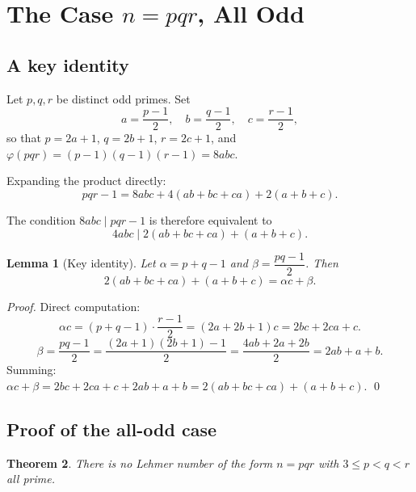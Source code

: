 \documentclass[12pt,a4paper]{amsart}
\newtheorem{theorem}{Theorem}[section]
\newtheorem{lemma}[theorem]{Lemma}
\theoremstyle{definition}
\newcommand{\euler}{\varphi}
\begin{document}
\section{The Case \texorpdfstring{$n = pqr$}{n = pqr}, All Odd}
\label{sec:pqr}

\subsection{A key identity}

Let $p, q, r$ be distinct odd primes.  Set
\[
  a = \frac{p-1}{2}, \quad
  b = \frac{q-1}{2}, \quad
  c = \frac{r-1}{2},
\]
so that $p = 2a+1$, $q = 2b+1$, $r = 2c+1$, and
$\euler(pqr) = (p-1)(q-1)(r-1) = 8abc$.

Expanding the product directly:
\begin{equation}
  pqr - 1 = 8abc + 4(ab + bc + ca) + 2(a + b + c).
  \label{eq:expansion}
\end{equation}

The condition $8abc \mid pqr - 1$ is therefore equivalent to
\begin{equation}
  4abc \mid 2(ab + bc + ca) + (a + b + c).
  \tag{HC}
  \label{eq:HC}
\end{equation}

\begin{lemma}[Key identity]
\label{lem:keyid}
Let $\alpha = p + q - 1$ and $\beta = \dfrac{pq - 1}{2}$.  Then
\begin{equation}
  2(ab + bc + ca) + (a + b + c) = \alpha c + \beta.
  \label{eq:keyid}
\end{equation}
\end{lemma}

\begin{proof}
Direct computation:
\[
  \alpha c = (p + q - 1) \cdot \frac{r-1}{2} = (2a + 2b + 1)c
           = 2bc + 2ca + c.
\]
\[
  \beta = \frac{pq - 1}{2} = \frac{(2a+1)(2b+1) - 1}{2}
        = \frac{4ab + 2a + 2b}{2} = 2ab + a + b.
\]
Summing: $\alpha c + \beta = 2bc + 2ca + c + 2ab + a + b
= 2(ab + bc + ca) + (a + b + c)$. \qed
\end{proof}

\subsection{Proof of the all-odd case}

\begin{theorem}
\label{thm:odd}
There is no Lehmer number of the form $n = pqr$ with $3 \le p < q < r$ all prime.
\end{theorem}
\end{document}
